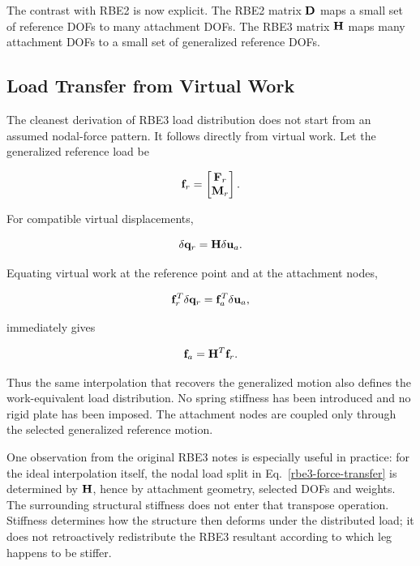 The contrast with RBE2 is now explicit. The RBE2 matrix $\mathbf{D}$ maps a small set
of reference DOFs to many attachment DOFs. The RBE3 matrix $\mathbf{H}$ maps many
attachment DOFs to a small set of generalized reference DOFs.

\subsection{Load Transfer from Virtual Work}

The cleanest derivation of RBE3 load distribution does not start from an assumed
nodal-force pattern. It follows directly from virtual work. Let the generalized
reference load be

\begin{equation}
    \mathbf{f}_r=
    \begin{bmatrix}
        \mathbf{F}_r\\\mathbf{M}_r
    \end{bmatrix}.
\end{equation}

For compatible virtual displacements,

\begin{equation}
    \delta\mathbf{q}_r=\mathbf{H}\delta\mathbf{u}_a.
\end{equation}

Equating virtual work at the reference point and at the attachment nodes,

\begin{equation}
    \mathbf{f}_r^T\delta\mathbf{q}_r
    = \mathbf{f}_a^T\delta\mathbf{u}_a,
\end{equation}

immediately gives

\begin{bbox}[0.88]
\begin{equation}\label{rbe3-force-transfer}
    \mathbf{f}_a = \mathbf{H}^T\mathbf{f}_r.
\end{equation}
\end{bbox}

Thus the same interpolation that recovers the generalized motion also defines
the work-equivalent load distribution. No spring stiffness has been introduced
and no rigid plate has been imposed. The attachment nodes are coupled only
through the selected generalized reference motion.


\begin{notebooknote}
One observation from the original RBE3 notes is especially useful in practice:
for the ideal interpolation itself, the nodal load split in
Eq.~\eqref{rbe3-force-transfer} is determined by $\mathbf{H}$, hence by attachment
geometry, selected DOFs and weights. The surrounding structural stiffness does
not enter that transpose operation. Stiffness determines how the structure then
deforms under the distributed load; it does not retroactively redistribute the
RBE3 resultant according to which leg happens to be stiffer.
\end{notebooknote}

